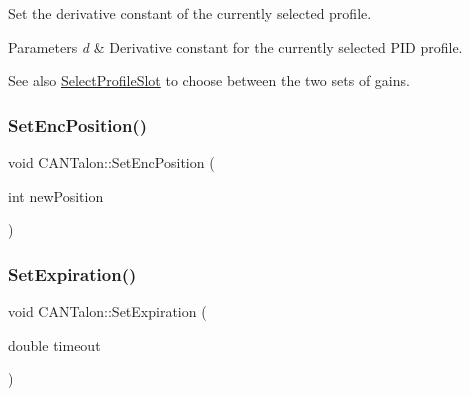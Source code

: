 Set the derivative constant of the currently selected profile.


\begin{DoxyParams}{Parameters}
{\em d} & Derivative constant for the currently selected P\+ID profile. \\
\hline
\end{DoxyParams}
\begin{DoxySeeAlso}{See also}
\hyperlink{class_c_a_n_talon_a0f478462884ed5e541179821c44b724f}{Select\+Profile\+Slot} to choose between the two sets of gains. 
\end{DoxySeeAlso}
\mbox{\label{class_c_a_n_talon_a00b16233647cf4ae540d14236d8ee01d}} 
\subsubsection{\texorpdfstring{Set\+Enc\+Position()}{SetEncPosition()}}
{\footnotesize\ttfamily void C\+A\+N\+Talon\+::\+Set\+Enc\+Position (\begin{DoxyParamCaption}\item[{int}]{new\+Position }\end{DoxyParamCaption})\hspace{0.3cm}{\ttfamily [virtual]}}

\mbox{\label{class_c_a_n_talon_ae1f3bf6c3bfa5ebc2ef95367d995bd0d}} 
\subsubsection{\texorpdfstring{Set\+Expiration()}{SetExpiration()}}
{\footnotesize\ttfamily void C\+A\+N\+Talon\+::\+Set\+Expiration (\begin{DoxyParamCaption}\item[{double}]{timeout }\end{DoxyParamCaption})\hspace{0.3cm}{\ttfamily [override]}}

\mbox{\label{class_c_a_n_talon_ac147cdb9096848beac85a25d04489d60}} 
